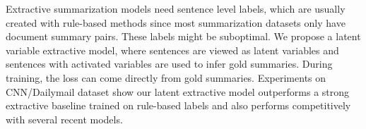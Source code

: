 Extractive summarization models need sentence level labels, which are usually created with rule-based methods since most summarization datasets only have document summary pairs. These labels might be suboptimal. We propose a latent variable extractive model, where sentences are viewed as latent variables and sentences with activated variables are used to infer gold summaries. During training, the loss can come directly from gold summaries. Experiments on CNN/Dailymail dataset show our latent extractive model outperforms a strong extractive baseline trained on rule-based labels and also performs competitively with several recent models.
